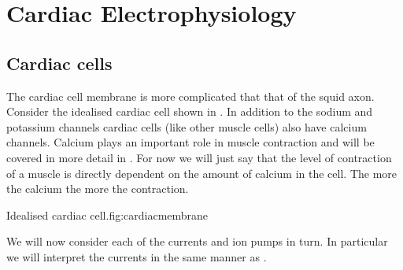 \chapter{Cardiac Electrophysiology}

\section{Cardiac cells}

The cardiac cell membrane is more complicated that that of the squid axon.
Consider the idealised cardiac cell shown in .  In
addition to the sodium and potassium channels cardiac cells (like other muscle
cells) also have calcium channels. Calcium plays an important role in muscle
contraction and will be covered in more detail in
. For now we will just say that the level of
contraction of a muscle is directly dependent on the amount of calcium in the
cell. The more the calcium the more the contraction.

{Idealised cardiac cell.}{fig:cardiacmembrane}{}

We will now consider each of the currents and ion pumps in turn. In particular
we will interpret the currents in the same manner as
\citet{difrancesco:1985}.

